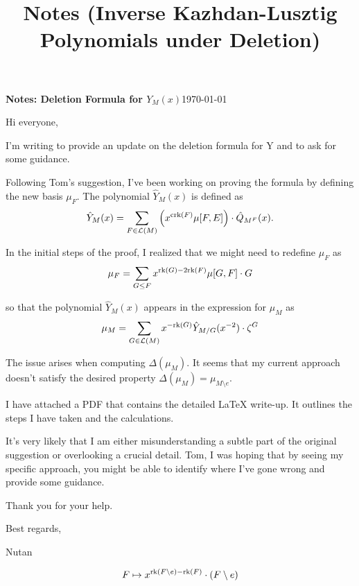 \documentclass[11pt]{article}
\title{\texorpdfstring{Notes (Inverse Kazhdan-Lusztig Polynomials under Deletion)}{Notes (Inverse Kazhdan-Lusztig Polynomials under Deletion)}}
\newcommand{\calL}{\mathcal{L}}
\newcommand{\rank}{\normalfont\text{rk}}
\newcommand{\corank}{\normalfont\text{crk}}
\theoremstyle{remark}
\begin{document}
\textbf{Notes: Deletion Formula for $Y_M(x)$}\hfill {\small{\today}}

\hrulefill %

Hi everyone,

I'm writing to provide an update on the deletion formula for Y and to ask for some guidance.

Following Tom's suggestion, I've been working on proving the formula by defining the new basis $\mu_F$.
The polynomial $\hat{Y}_M(x)$ is defined as
\[
    \hat{Y}_M(x) = \sum_{F \in \calL(M)} \left( x^{\corank(F)}\mu[F,E] \right) \cdot \hat{Q}_{M^F}(x).
\]



In the initial steps of the proof, I realized that we might need to redefine $\mu_F$ as
\[
    \mu_F = \sum_{G \leq F} x^{\rank(G) - 2\rank(F)}\mu[G,F]\cdot G
\]

so that the polynomial $\hat{Y}_M(x)$ appears in the expression for $\mu_M$ as
\[
    \mu_M = \sum_{G \in \calL(M)} x^{-\rank(G)}\hat{Y}_{M/G}(x^{-2})\cdot \zeta^G
\]




The issue arises when computing $\Delta(\mu_M)$. It seems that my current approach doesn't satisfy the desired property $\Delta(\mu_M) = \mu_{M\setminus e}$.

I have attached a PDF that contains the detailed LaTeX write-up. It outlines the steps I have taken and the calculations.

It's very likely that I am either misunderstanding a subtle part of the original suggestion or overlooking a crucial detail. Tom, I was hoping that by seeing my specific approach, you might be able to identify where I've gone wrong and provide some guidance.

Thank you for your help.

Best regards,

Nutan

\[F\mapsto x^{\rank(F\setminus e)-\rank(F)}\cdot (F\setminus e)\]
\end{document}
